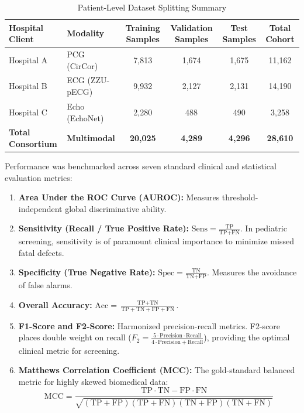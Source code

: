 \documentclass[12pt,a4paper]{amritareport}
\begin{document}
\begin{table}[htbp]
	\centering
	\caption{Patient-Level Dataset Splitting Summary}
	\label{tab:split_summary}
	\begin{tabular}{|l|l|c|c|c|c|}
		\hline
		\textbf{Hospital Client} & \textbf{Modality} & \textbf{Training Samples} & \textbf{Validation Samples} & \textbf{Test Samples} & \textbf{Total Cohort} \\
		\hline
		Hospital A & PCG (CirCor) & 7,813 & 1,674 & 1,675 & 11,162 \\
		Hospital B & ECG (ZZU-pECG) & 9,932 & 2,127 & 2,131 & 14,190 \\
		Hospital C & Echo (EchoNet) & 2,280 & 488 & 490 & 3,258 \\
		\hline
		\textbf{Total Consortium} & \textbf{Multimodal} & \textbf{20,025} & \textbf{4,289} & \textbf{4,296} & \textbf{28,610} \\
		\hline
	\end{tabular}
\end{table}

Performance was benchmarked across seven standard clinical and statistical evaluation metrics:
\begin{enumerate}
	\item \textbf{Area Under the ROC Curve (AUROC):} Measures threshold-independent global discriminative ability.
	\item \textbf{Sensitivity (Recall / True Positive Rate):} $\text{Sens} = \frac{\text{TP}}{\text{TP} + \text{FN}}$. In pediatric screening, sensitivity is of paramount clinical importance to minimize missed fatal defects.
	\item \textbf{Specificity (True Negative Rate):} $\text{Spec} = \frac{\text{TN}}{\text{TN} + \text{FP}}$. Measures the avoidance of false alarms.
	\item \textbf{Overall Accuracy:} $\text{Acc} = \frac{\text{TP} + \text{TN}}{\text{TP} + \text{TN} + \text{FP} + \text{FN}}$.
	\item \textbf{F1-Score and F2-Score:} Harmonized precision-recall metrics. F2-score places double weight on recall ($F_2 = \frac{5 \cdot \text{Precision} \cdot \text{Recall}}{4 \cdot \text{Precision} + \text{Recall}}$), providing the optimal clinical metric for screening.
	\item \textbf{Matthews Correlation Coefficient (MCC):} The gold-standard balanced metric for highly skewed biomedical data:
	\begin{equation}
		\text{MCC} = \frac{\text{TP} \cdot \text{TN} - \text{FP} \cdot \text{FN}}{\sqrt{(\text{TP}+\text{FP})(\text{TP}+\text{FN})(\text{TN}+\text{FP})(\text{TN}+\text{FN})}}
	\end{equation}
\end{enumerate}
\end{document}
